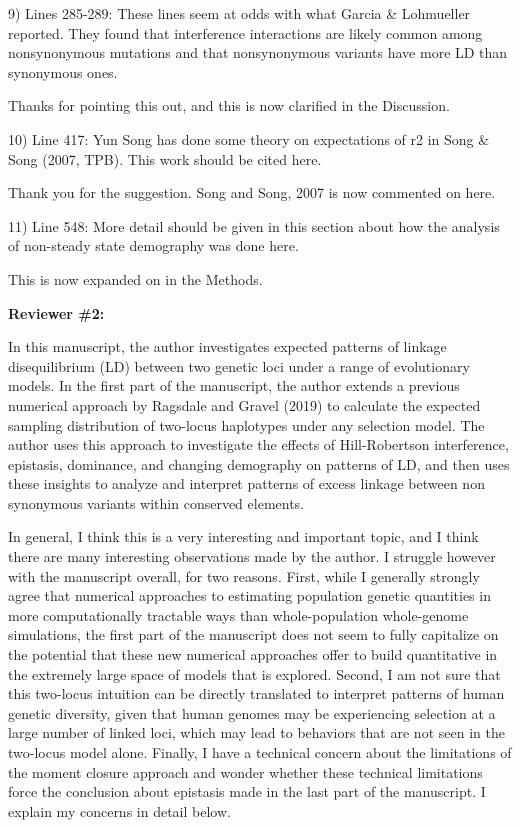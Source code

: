 \documentclass{article}
\newenvironment{response}%
  {\list{}{\leftmargin=0.5in\rightmargin=0.5in\color{blue}}\item[]}%
  {\endlist}
\begin{document}
9) Lines 285-289: These lines seem at odds with what Garcia \& Lohmueller
reported. They found that interference interactions are likely common among
nonsynonymous mutations and that nonsynonymous variants have more LD than
synonymous ones.

\begin{response}
    Thanks for pointing this out, and this is now clarified in the Discussion.
\end{response}

10) Line 417: Yun Song has done some theory on expectations of r2 in Song \&
Song (2007, TPB). This work should be cited here.

\begin{response}
    Thank you for the suggestion. Song and Song, 2007 is now commented on here.
\end{response}

11) Line 548: More detail should be given in this section about how the
analysis of non-steady state demography was done here.

\begin{response}
    This is now expanded on in the Methods.
\end{response}



\textbf{Reviewer \#2:}

In this manuscript, the author investigates expected patterns of linkage
disequilibrium (LD) between two genetic loci under a range of evolutionary
models. In the first part of the manuscript, the author extends a previous
numerical approach by Ragsdale and Gravel (2019) to calculate the expected
sampling distribution of two-locus haplotypes under any selection model. The
author uses this approach to investigate the effects of Hill-Robertson
interference, epistasis, dominance, and changing demography on patterns of LD,
and then uses these insights to analyze and interpret patterns of excess
linkage between non synonymous variants within conserved elements.

In general, I think this is a very interesting and important topic, and I think
there are many interesting observations made by the author. I struggle however
with the manuscript overall, for two reasons. First, while I generally strongly
agree that numerical approaches to estimating population genetic quantities in
more computationally tractable ways than whole-population whole-genome
simulations, the first part of the manuscript does not seem to fully capitalize
on the potential that these new numerical approaches offer to build
quantitative in the extremely large space of models that is explored. Second, I
am not sure that this two-locus intuition can be directly translated to
interpret patterns of human genetic diversity, given that human genomes may be
experiencing selection at a large number of linked loci, which may lead to
behaviors that are not seen in the two-locus model alone. Finally, I have a
technical concern about the limitations of the moment closure approach and
wonder whether these technical limitations force the conclusion about epistasis
made in the last part of the manuscript. I explain my concerns in detail below.
\end{document}

